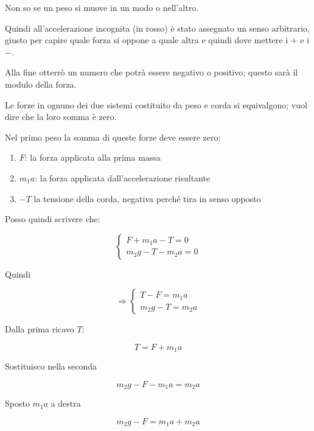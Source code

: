 Non so se un peso si muove in un modo o nell'altro.

Quindi all'accelerazione incognita (in rosso) è stato assegnato un senso arbitrario, giusto per capire quale forza si oppone a quale altra e quindi dove mettere i $+$ e i $-$.

Alla fine otterrò un numero che potrà essere negativo o positivo; questo sarà il modulo della forza.

Le forze in ognuno dei due sistemi costituito da peso e corda si equivalgono; vuol dire che la loro somma è zero.

Nel primo peso la somma di queste forze deve essere zero:

\begin{enumerate}
\item $F$: la forza applicata alla prima massa
\item $m_1a$: la forza applicata dall'accelerazione risultante
\item $-T$ la tensione della corda, negativa perché tira in senso opposto
\end{enumerate}

Posso quindi scrivere che:
\setcounter{equation}{0}

\begin{equation}
\left\{
\begin{array}{ll}
F + m_1a -T = 0\\
m_2g -T - m_2a =0
\end{array}
\right.
\end{equation}

Quindi

\begin{equation}
\Rightarrow
\left\{
\begin{array}{ll}
T - F = m_1a\\
m_2g -T = m_2a
\end{array}
\right.
\end{equation}

Dalla prima ricavo $T$:


\begin{equation}
T = F + m_1a
\end{equation}

Sostituisco nella seconda

\begin{equation}
m_2g -F - m_1a = m_2a
\end{equation}

Sposto $m_1a$ a destra

\begin{equation}
m_2g -F = m_1a + m_2a
\end{equation}

